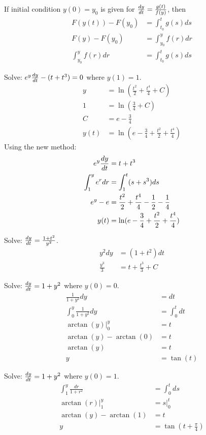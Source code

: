 \documentclass[12pt]{article}
\begin{document}
If initial condition $y(0) = y_0$ is given for $\frac{dy}{dt} = \frac{g(t)}{f(y)}$, then $$ \begin{aligned} F(y(t)) - F(y_0) &= \int_{t_0}^t g(s)ds \\ F(y) - F(y_0) &= \int_{y_0}^y f(r)dr \\ \int_{y_0}^y f(r)dr &= \int_{t_0}^t g(s)ds \end{aligned} $$
\begin{example} Solve: $e^y\frac{dy}{dt} - (t + t^3) = 0$ where $y(1) = 1$. $$ \begin{aligned} 
y &= \ln(\frac{t^2}{2} + \frac{t^4}{4} + C) \\ 1 &= \ln(\frac{3}{4} + C) \\ C &= e - \frac{3}{4} \\ 
y(t) &= \ln(e - \frac{3}{4} + \frac{t^2}{2} + \frac{t^4}{4}) \end{aligned} $$ Using the new method: $$\begin{aligned} e^y\frac{dy}{dt} &= t + t^3 \\ \int_1^y e^rdr &= \int_1^t (s + s^3)ds \\ e^y - e &= \frac{t^2}{2} + \frac{t^4}{4} - \frac{1}{2} - \frac{1}{4} \\ y(t) &= \ln(e - \frac{3}{4} + \frac{t^2}{2} + \frac{t^4}{4}) \end{aligned} $$ \end{example} 
\begin{example} Solve: $\frac{dy}{dt} = \frac{1 + t^2}{y^2}$. 
$$\begin{aligned} y^2dy &= (1 + t^2)dt \\ \frac{y^3}{3} &= t + \frac{t^3}{3} + C \end{aligned} $$ \end{example} 
\begin{example} Solve: $\frac{dy}{dt} = 1 + y^2$ where $y(0) = 0$. 
$$\begin{aligned} \frac{1}{1 + y^2}dy &= dt \\ \int_0^y \frac{1}{1 + y^2}dy &= \int_0^t dt \\ \arctan(y)\big|_0^y &= t \\ \arctan(y) - \arctan(0) &= t \\ \arctan(y) &= t \\ y &= \tan(t) \end{aligned} $$ \end{example}
\begin{example} Solve: $\frac{dy}{dt} = 1 + y^2$ where $y(0) = 1$. $$\begin{aligned} \int_1^y \frac{dr}{1 + r^2} &= \int_0^t ds \\ \arctan(r)\Big|_1^y &= s\Big|_0^t \\ \arctan(y) - \arctan(1) &= t \\ y &= \tan(t + \frac{\pi}{4}) \end{aligned} $$ \end{example} 
\end{document}
